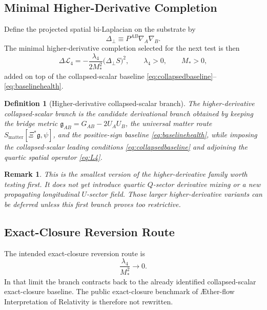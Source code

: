 \documentclass[11pt]{article}
\newcommand{\Aflow}{\AE{}ther-flow}
\newcommand{\TheoryName}{\Aflow{} Interpretation of Relativity}
\newcommand{\BridgeMetric}{\mathfrak{g}}
\newtheorem{definition}{Definition}
\newtheorem{remark}{Remark}
\begin{document}
\subsection{Minimal Higher-Derivative Completion}

Define the projected spatial bi-Laplacian on the substrate by
\begin{equation}
\Delta_{\perp}
\equiv
P^{AB}\nabla_A\nabla_B.
\label{eq:Deltaperp}
\end{equation}
The minimal higher-derivative completion selected for the next test is then
\begin{equation}
\Delta\mathcal L_{4}
=
-\frac{\lambda_4}{2M_*^2}\bigl(\Delta_{\perp}S\bigr)^2,
\qquad
\lambda_4>0,
\qquad
M_*>0,
\label{eq:L4}
\end{equation}
added on top of the collapsed-scalar baseline \eqref{eq:collapsedbaseline}--\eqref{eq:baselinehealth}.

\begin{definition}[Higher-derivative collapsed-scalar branch]
The higher-derivative collapsed-scalar branch is the candidate derivational branch obtained by keeping the bridge metric \(\BridgeMetric_{AB}=G_{AB}-2U_AU_B\), the universal matter route \(S_{\mathrm{matter}}[\Xi^*\BridgeMetric,\psi]\), and the positive-sign baseline \eqref{eq:baselinehealth}, while imposing the collapsed-scalar leading conditions \eqref{eq:collapsedbaseline} and adjoining the quartic spatial operator \eqref{eq:L4}.
\end{definition}

\begin{remark}
This is the smallest version of the higher-derivative family worth testing first. It does not yet introduce quartic \(Q\)-sector derivative mixing or a new propagating longitudinal \(U\)-sector field. Those larger higher-derivative variants can be deferred unless this first branch proves too restrictive.
\end{remark}

\subsection{Exact-Closure Reversion Route}

The intended exact-closure reversion route is
\begin{equation}
\frac{\lambda_4}{M_*^2}\to 0.
\label{eq:reversion}
\end{equation}
In that limit the branch contracts back to the already identified collapsed-scalar exact-closure baseline. The public exact-closure benchmark of \TheoryName{} is therefore not rewritten.
\end{document}
